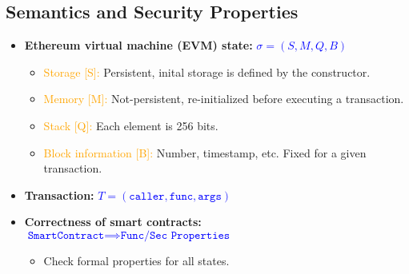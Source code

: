 \begin{minipage}{0.45\linewidth}
    \centering      
    \def\svgwidth{\linewidth}
        
\end{minipage}
\begin{minipage}{0.45\linewidth}
    \centering      
    \def\svgwidth{\linewidth}
        
\end{minipage}

\subsection{Semantics and Security Properties}
\begin{itemize}
    \item \textbf{Ethereum virtual machine (EVM) state:} \textcolor{blue}{$\sigma = (S,M,Q,B)$}
    \begin{itemize}
        \item \textcolor{orange}{Storage [S]:} Persistent, inital storage is defined by the constructor.
        \item \textcolor{orange}{Memory [M]:} Not-persistent, re-initialized before  executing a transaction.
        \item \textcolor{orange}{Stack [Q]:} Each element is 256 bits.
        \item \textcolor{orange}{Block information [B]:} Number, timestamp, etc. Fixed for a given transaction.
    \end{itemize}{}
    \item \textbf{Transaction: } \textcolor{blue}{$T = (\texttt{caller}, \texttt{func}, \texttt{args})$}
    \item \textbf{Correctness of smart contracts:} \textcolor{blue}{$\texttt{SmartContract} \implies \texttt{Func/Sec
    Properties}$} 
    \begin{itemize}
        \item Check formal properties for all states.
    \end{itemize}{}
\end{itemize}{}